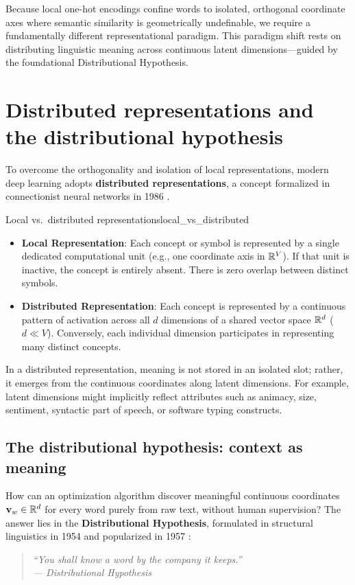 \documentclass[../../main.tex]{subfiles}
\begin{document}
Because local one-hot encodings confine words to isolated, orthogonal coordinate axes where semantic similarity is geometrically undefinable, we require a fundamentally different representational paradigm. This paradigm shift rests on distributing linguistic meaning across continuous latent dimensions---guided by the foundational Distributional Hypothesis.

\clearpage
\section{Distributed representations and the distributional hypothesis}
\label{sec:distributed_representations}

To overcome the orthogonality and isolation of local representations, modern deep learning adopts \textbf{distributed representations}, a concept formalized in connectionist neural networks in 1986 \cite{rumelhart1986}.

\begin{definition}{Local vs.~distributed representations}{local_vs_distributed}
\begin{itemize}
    \item \textbf{Local Representation}: Each concept or symbol is represented by a single dedicated computational unit (e.g., one coordinate axis in $\mathbb{R}^V$). If that unit is inactive, the concept is entirely absent. There is zero overlap between distinct symbols.
    \item \textbf{Distributed Representation}: Each concept is represented by a continuous pattern of activation across all $d$ dimensions of a shared vector space $\mathbb{R}^d$ ($d \ll V$). Conversely, each individual dimension participates in representing many distinct concepts.
\end{itemize}
\end{definition}

In a distributed representation, meaning is not stored in an isolated slot; rather, it emerges from the continuous coordinates along latent dimensions. For example, latent dimensions might implicitly reflect attributes such as animacy, size, sentiment, syntactic part of speech, or software typing constructs.

\subsection{The distributional hypothesis: context as meaning}
\label{subsec:distributional_hypothesis}

How can an optimization algorithm discover meaningful continuous coordinates $\mathbf{v}_w \in \mathbb{R}^d$ for every word purely from raw text, without human supervision? The answer lies in the \textbf{Distributional Hypothesis}, formulated in structural linguistics in 1954 \cite{harris1954} and popularized in 1957 \cite{firth1957}:
\begin{quote}
\centering
\itshape
``You shall know a word by the company it keeps.''\\
\upshape\hfill--- Distributional Hypothesis \cite{firth1957}
\end{quote}
\end{document}
